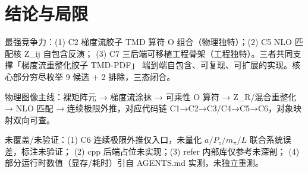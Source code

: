 \documentclass[UTF8]{ctexart}
\begin{document}
\section{结论与局限}
\begin{conclbox}
最强竞争力：(1) C2 梯度流胶子 TMD 算符 O 组合（物理独特）；(2) C5 NLO 匹配核 Z\_ij 自包含反演；
(3) C7 三后端可移植工程骨架（工程独特）。三者共同支撑「梯度流重整化胶子 TMD-PDF」
端到端自包含、可复现、可扩展的实现。核心部分穷尽枚举 9 候选 + 2 排除，三态闭合。
\end{conclbox}
\begin{ideabox}
物理图像主线：裸矩阵元 → 梯度流涂抹 → 可乘性 O 算符 → Z\_R/混合重整化 →
NLO 匹配 → 连续极限外推，对应代码链 C1→C2→C3/C4→C5→C6，对象映射双向可查。
\end{ideabox}
\begin{warnbox}
未覆盖/未验证：(1) C6 连续极限外推仅入口，未量化 $a/P_z/m_\pi/L$ 联合系统误差，标注\textcolor{warn}{未验证}；
(2) cpp 后端占位未实现；(3) refer 内部库仅参考未深剖；
(4) 部分运行时数值（显存/耗时）引自 AGENTS.md 实测，未独立重测。
\end{warnbox}
\end{document}
